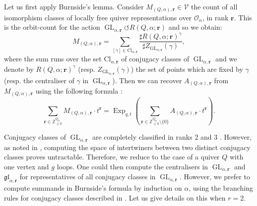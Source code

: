 \documentclass[11pt,english]{article}
\numberwithin{equation}{section}
\numberwithin{figure}{section}
\theoremstyle{definition}
\theoremstyle{plain}
\theoremstyle{remark}
\DeclareMathOperator{\GL}{GL}
\DeclareMathOperator{\Exp}{Exp}
\newcommand\rr{\mathbf{r}}
\newcommand\ZZ{\mathbb{Z}}
\begin{document}
Let us first apply Burnside's lemma. Consider $M_{(Q,\alpha),\rr}\in\mathcal{V}$
the count of all isomorphism classes of locally free quiver representations
over $\mathcal{O}_{\alpha}$, in rank $\rr$. This is the orbit-count
for the action $\GL_{\alpha,\rr}\circlearrowleft R(Q,\alpha;\rr)$
and so we obtain:\[
M_{(Q,\alpha),\rr}=\sum_{[\gamma]\in\mathrm{Cl}_{\alpha,\rr}}\frac{\sharp R(Q,\alpha;\rr)^{\gamma}}{\sharp Z_{\GL_{\alpha,\rr}}(\gamma)},
\] where the sum runs over the set $\mathrm{Cl}_{\alpha,\rr}$ of conjugacy
classes of $\GL_{\alpha,\rr}$ and we denote by $R(Q,\alpha;\rr)^{\gamma}$
(resp. $Z_{\GL_{\alpha,\rr}}(\gamma)$) the set of points which are
fixed by $\gamma$ (resp. the centraliser of $\gamma$ in $\GL_{\alpha,\rr}$).
Then we can recover $A_{(Q,\alpha),\rr}$ from $M_{(Q,\alpha),\rr}$
using the following formula \cite[Thm. 1.2.]{Moz19}:\[
\sum_{\rr\in\ZZ_{\geq0}^{Q_0}}M_{(Q,\alpha),\rr}\cdot t^{\rr}=\Exp_{q,t}\left(\sum_{\rr\in\ZZ_{\geq0}^{Q_0}\setminus\{0\}}A_{(Q,\alpha),\rr}\cdot t^{\rr}\right).
\]

Conjugacy classes of $\GL_{\alpha,\rr}$ are completely classified
in ranks 2 and 3 \cite{AOPV09,AKOV16}. However, as noted in \cite[\S 4]{AOPV09},
computing the space of intertwiners between two distinct conjugacy
classes proves untractable. Therefore, we reduce to the case of a
quiver $Q$ with one vertex and $g$ loops. One could then compute
the centralisers in $\GL_{\alpha,\rr}$ and $\mathfrak{gl}_{\alpha,\rr}$
for representatives of all conjugacy classes in $\GL_{\alpha,\rr}$.
However, we prefer to compute summands in Burnside's formula by induction
on $\alpha$, using the branching rules for conjugacy classes described
in \cite{AOPV09,AKOV16}. Let us give details on this when $r=2$.
\end{document}
